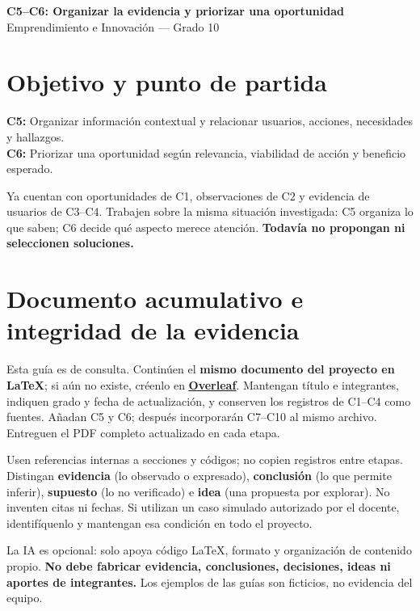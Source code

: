 \documentclass[12pt,a4paper]{article}
\newcommand{\guidelink}[2]{\href{#1}{\textcolor{LinkColor}{\textbf{\underline{#2}}}}}
\newcommand{\instruction}[1]{\textcolor{InstructionColor}{\textbf{#1}}}
\newcommand{\concept}[1]{\textcolor{ConceptColor}{\textbf{#1}}}
\begin{document}
\begin{center}
{\Large\bfseries\color{HeadingColor} C5--C6: Organizar la evidencia y priorizar una oportunidad}\\[3pt]
Emprendimiento e Innovación --- Grado 10
\end{center}

\section*{Objetivo y punto de partida}
\concept{C5:} Organizar información contextual y relacionar usuarios, acciones, necesidades y hallazgos.\\
\concept{C6:} Priorizar una oportunidad según relevancia, viabilidad de acción y beneficio esperado.

Ya cuentan con oportunidades de C1, observaciones de C2 y evidencia de usuarios de C3--C4. Trabajen sobre la misma situación investigada: C5 organiza lo que saben; C6 decide qué aspecto merece atención. \instruction{Todavía no propongan ni seleccionen soluciones.}

\section*{Documento acumulativo e integridad de la evidencia}
Esta guía es de consulta. Continúen el \textbf{mismo documento del proyecto en LaTeX}; si aún no existe, créenlo en \guidelink{https://www.overleaf.com/}{Overleaf}. Mantengan título e integrantes, indiquen grado y fecha de actualización, y conserven los registros de C1--C4 como fuentes. Añadan C5 y C6; después incorporarán C7--C10 al mismo archivo. Entreguen el PDF completo actualizado en cada etapa.

Usen referencias internas a secciones y códigos; no copien registros entre etapas. Distingan \concept{evidencia} (lo observado o expresado), \concept{conclusión} (lo que permite inferir), \concept{supuesto} (lo no verificado) e \concept{idea} (una propuesta por explorar). No inventen citas ni fechas. Si utilizan un caso simulado autorizado por el docente, identifíquenlo y mantengan esa condición en todo el proyecto.

La IA es opcional: solo apoya código LaTeX, formato y organización de contenido propio. \instruction{No debe fabricar evidencia, conclusiones, decisiones, ideas ni aportes de integrantes.} Los ejemplos de las guías son ficticios, no evidencia del equipo.
\end{document}
